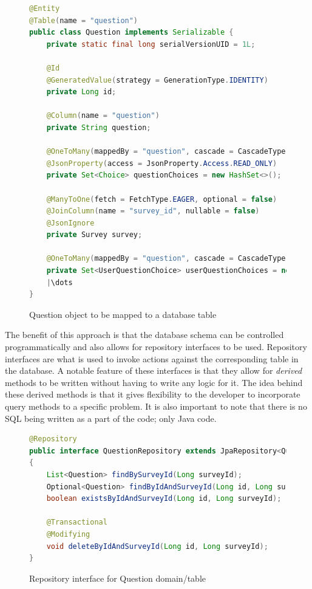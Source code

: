 \clearpage
\begin{figure}[ht]
    \centering
    \begin{lstlisting}[language=Java, escapechar=|]
@Entity
@Table(name = "question")
public class Question implements Serializable {
    private static final long serialVersionUID = 1L;

    @Id
    @GeneratedValue(strategy = GenerationType.IDENTITY)
    private Long id;

    @Column(name = "question")
    private String question;
    
    @OneToMany(mappedBy = "question", cascade = CascadeType.ALL)
    @JsonProperty(access = JsonProperty.Access.READ_ONLY)
    private Set<Choice> questionChoices = new HashSet<>();
    
    @ManyToOne(fetch = FetchType.EAGER, optional = false)
    @JoinColumn(name = "survey_id", nullable = false)
    @JsonIgnore
    private Survey survey;
    
    @OneToMany(mappedBy = "question", cascade = CascadeType.ALL)
    private Set<UserQuestionChoice> userQuestionChoices = new HashSet<>();
    |\dots
}    
    \end{lstlisting}
    \caption{Question object to be mapped to a database table}
    \label{question object}
\end{figure}


The benefit of this approach is that the database schema can be controlled programmatically and also allows for repository interfaces to be used.
Repository interfaces are what is used to invoke actions against the corresponding table in the database.
A notable feature of these interfaces is that they allow for \emph{derived} methods to be written without having to write any logic for it.
The idea behind these derived methods is that it gives flexibility to the developer to incorporate query methods to a specific problem.
It is also important to note that there is no SQL being written as a part of the code; only Java code.


\begin{figure}[ht]
    \centering
    \begin{lstlisting}[language=Java]
@Repository
public interface QuestionRepository extends JpaRepository<Question,Long> 
{
    List<Question> findBySurveyId(Long surveyId);
    Optional<Question> findByIdAndSurveyId(Long id, Long surveyId);
    boolean existsByIdAndSurveyId(Long id, Long surveyId);

    @Transactional
    @Modifying
    void deleteByIdAndSurveyId(Long id, Long surveyId);
}
    \end{lstlisting}
    \caption{Repository interface for Question domain/table}
    \label{repo example}
\end{figure}


